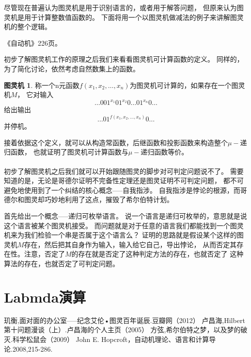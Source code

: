 \documentclass[12pt,a4paper,oneside]{ctexrep}
\theoremstyle{definition}
\newtheorem{tm}{图灵机}
\begin{document}
尽管现在普遍认为图灵机是用于识别语言的，或者用于解答问题，
但原来认为图灵机是用于计算整数值函数的。
下面将用一个以图灵机做减法的例子来讲解图灵机的整个逻辑。

《自动机》226页。

初步了解图灵机工作的原理之后我们来看看图灵机可计算函数的定义。
同样的，为了简化讨论，依然考虑自然数集上的函数。

\begin{tm}
称一个n元函数$f(x_1,x_2,\ldots,x_n)$为图灵机可计算的，如果存在一个图灵机$M$，
它对输入
\begin{equation}
\ldots 001^{x_1}01^{x_2}0\ldots01^{x_n}0\ldots
\end{equation}
给出输出
\begin{equation}
\ldots01^{f(x_1,x_2,\ldots,x_n)}0\ldots
\end{equation}
并停机。
\end{tm}
接着依据这个定义，就可以从构造常函数，后继函数和投影函数来构造整个$\mu-$递归函数，
也就证明了图灵机可计算函数与$\mu-$递归函数等价。

\subsubsection{}
初步了解图灵机之后我们就可以开始跟随图灵的脚步对可判定问题说不了。
需要知道的是，无论是哥德尔证明不完备性定理还是图灵证明不可判定问题，
都不可避免地使用到了一个纠结的核心概念-----自我指涉。
自我指涉是悖论的根源，而哥德尔和图灵却巧妙地利用了这点，摧毁了希尔伯特计划。

首先给出一个概念-----递归可枚举语言。
说一个语言是递归可枚举的，意思就是说这个语言被某个图灵机接受。
而问题就是对于任意的语言我们都能找到一个图灵机来为我们检验一个串是否属于这个语言么？
证明的思路就是假设某个这样的图灵机$M$存在，然后把其自身作为输入，输入给它自己，导出悖论，
从而否定其存在性。注意，否定了$M$的存在就是否定了这种判定方法的存在，也就否定了
这种算法的存在，也就否定了可判定问题。



\chapter{Labmda演算}




\begin{thebibliography}{99}
 玑衡,面对面的办公室-----纪念艾伦•图灵百年诞辰.豆瓣网（2012）
 卢昌海,Hilbert第十问题漫谈（上）.卢昌海的个人主页（2005）
 方弦,希尔伯特之梦，以及梦的破灭.科学松鼠会（2009）
 John E. Hopcroft，自动机理论、语言和计算导论.2008,215-286.
\end{thebibliography}
\end{document}

